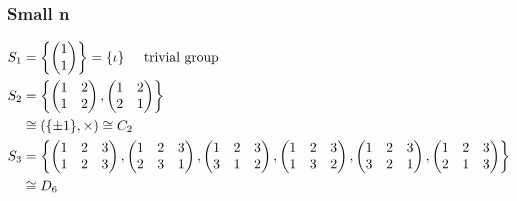 \hypertarget{small-n}{%
\subsubsection{Small n}\label{small-n}}

\begin{example}
  
\begin{align*}
  S_1 &= \left\{ \begin{pmatrix}1 \\1\end{pmatrix} \right\} = \{ \iota \} \hspace{.5cm} \text{trivial group} \\
  S_2 &= \left\{ \begin{pmatrix}
  1 & 2 \\
  1 & 2
  \end{pmatrix}, \begin{pmatrix}
  1 & 2 \\
  2 & 1
  \end{pmatrix} \right\} \\
  &\cong \left( \{ \pm 1 \}, \times \right) \cong C_2 \\
  S_3 &= \left\{ \begin{pmatrix}
  1 & 2 & 3 \\
  1 & 2 & 3
  \end{pmatrix}, 
  \begin{pmatrix}
  1 & 2 & 3 \\
  2 & 3 & 1
  \end{pmatrix}, 
  \begin{pmatrix}
      1 & 2 & 3 \\
      3 & 1 & 2
  \end{pmatrix}, 
  \begin{pmatrix}
      1 & 2 & 3 \\
      1 & 3 & 2
  \end{pmatrix}, 
  \begin{pmatrix}
      1 & 2 & 3 \\
      3 & 2 & 1
  \end{pmatrix}, 
  \begin{pmatrix}
      1 & 2 & 3 \\
      2 & 1 & 3
  \end{pmatrix} \right\} \\
  & \cong D_6
\end{align*}
\end{example} 

